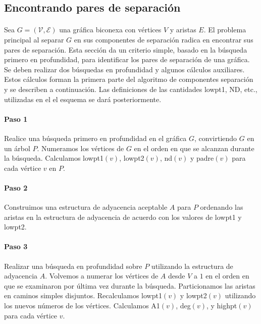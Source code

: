 \subsection{Encontrando pares de separación}

\paragraph{}
Sea $G = \left(\mathscr{V}, \mathscr{E}\right)$ una gráfica biconexa con vértices $V$ y aristas $E$. El problema principal al separar $G$ en sus componentes de separación radica en encontrar sus pares de separación. Esta sección da un criterio simple, basado en la búsqueda primero en profundidad, para identificar los pares de separación de una gráfica. Se deben realizar dos búsquedas en profundidad y algunos cálculos auxiliares. Estos cálculos forman la primera parte del algoritmo de componentes separación y se describen a continuación. Las definiciones de las cantidades lowpt1, ND, etc., utilizadas en el el esquema se dará posteriormente.

\paragraph{Paso 1}
Realice una búsqueda primero en profundidad en el gráfica $G$, convirtiendo $G$ en un árbol $P$. Numeramos los vértices de $G$ en el orden en que se alcanzan durante la búsqueda. Calculamos lowpt1$\left(v\right)$, lowpt2$\left(v\right)$, nd$\left(v\right)$ y padre$\left(v\right)$ para cada vértice $v$ en $P$.

\paragraph{Paso 2}
Construimos una estructura de adyacencia aceptable $A$ para $P$ ordenando las aristas en la estructura de adyacencia de acuerdo con los valores de lowpt1 y lowpt2.

\paragraph{Paso 3}
Realizar una búsqueda en profundidad sobre $P$ utilizando la estructura de adyacencia $A$. Volvemos a numerar los vértices de $A$ desde $V$ a $1$ en el orden en que se examinaron por última vez durante la búsqueda. Particionamos las aristas en caminos simples disjuntos. Recalculamos lowpt1$\left(v\right)$ y lowpt2$\left(v\right)$ utilizando los nuevos números de los vértices. Calculamos A1$\left(v\right)$, deg$\left(v\right)$, y highpt$\left(v\right)$ para cada vértice $v$.

